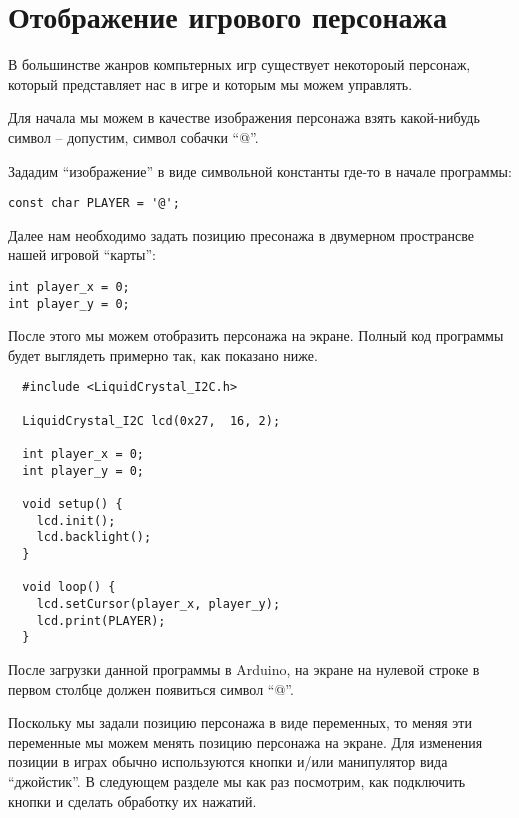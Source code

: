 \documentclass[../sparc.tex]{subfiles}
\begin{document}
\section{Отображение игрового персонажа}

В большинстве жанров компьтерных игр существует некотороый персонаж, который
представляет нас в игре и которым мы можем управлять.

Для начала мы можем в качестве изображения персонажа взять какой-нибудь символ
-- допустим, символ собачки ``@''.

Зададим ``изображение'' в виде символьной константы где-то в начале программы:

\begin{verbatim}
const char PLAYER = '@';
\end{verbatim}

Далее нам необходимо задать позицию пресонажа в двумерном пространсве нашей
игровой ``карты'':

\begin{verbatim}
int player_x = 0;
int player_y = 0;
\end{verbatim}

После этого мы можем отобразить персонажа на экране.  Полный код программы будет
выглядеть примерно так, как показано ниже.

\begin{verbatim}
  #include <LiquidCrystal_I2C.h>

  LiquidCrystal_I2C lcd(0x27,  16, 2);

  int player_x = 0;
  int player_y = 0;

  void setup() {
    lcd.init();
    lcd.backlight();
  }

  void loop() {
    lcd.setCursor(player_x, player_y);
    lcd.print(PLAYER);
  }
\end{verbatim}

После загрузки данной программы в Arduino, на экране на нулевой строке в первом
столбце должен появиться символ ``@''.

Поскольку мы задали позицию персонажа в виде переменных, то меняя эти переменные
мы можем менять позицию персонажа на экране.  Для изменения позиции в играх
обычно используются кнопки и/или манипулятор вида ``джойстик''.  В следующем
разделе мы как раз посмотрим, как подключить кнопки и сделать обработку их
нажатий.
\end{document}
